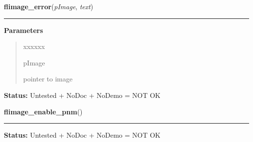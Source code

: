 \hspace{.8\funcindent}\begin{boxedminipage}{\funcwidth}

    \raggedright \textbf{flimage\_error}(\textit{pImage}, \textit{text})

    \vspace{-1.5ex}

    \rule{\textwidth}{0.5\fboxrule}
\setlength{\parskip}{2ex}
\setlength{\parskip}{1ex}
      \textbf{Parameters}
      \vspace{-1ex}

      \begin{quote}
        \begin{Ventry}{xxxxxx}

          \item[pImage]

          pointer to image

        \end{Ventry}

      \end{quote}

\textbf{Status:} Untested + NoDoc + NoDemo = NOT OK



    \end{boxedminipage}

    \label{xformslib:library:flimage_enable_pnm}

    \vspace{0.5ex}

\hspace{.8\funcindent}\begin{boxedminipage}{\funcwidth}

    \raggedright \textbf{flimage\_enable\_pnm}()

    \vspace{-1.5ex}

    \rule{\textwidth}{0.5\fboxrule}
\setlength{\parskip}{2ex}
\setlength{\parskip}{1ex}
\textbf{Status:} Untested + NoDoc + NoDemo = NOT OK



    \end{boxedminipage}

    \label{xformslib:library:flimage_set_fits_bits}

